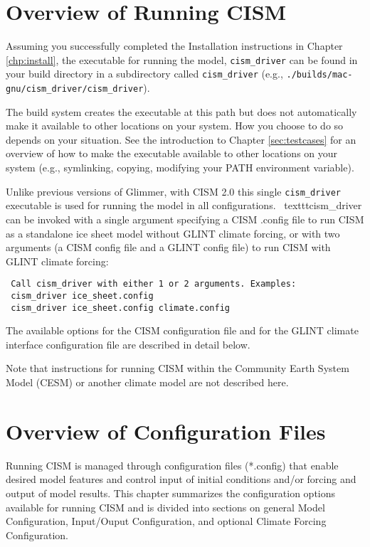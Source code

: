 \label{ch:runcism}

\section{Overview of Running CISM}

Assuming you successfully completed the Installation instructions in Chapter \ref{chp:install},
the executable for running the model, \texttt{cism\_driver} can be found in your 
build directory in a subdirectory called \texttt{cism\_driver} 
(e.g., \texttt{./builds/mac-gnu/cism\_driver/cism\_driver}).

The build system creates the executable at this path but does not automatically
make it available to other locations on your system.  How you choose to do so depends 
on your situation.  See the introduction to Chapter \ref{sec:testcases} for 
an overview of how to make the executable available to other locations on your system
(e.g., symlinking, copying, modifying your PATH environment variable).

Unlike previous versions of Glimmer, with CISM 2.0 this single \texttt{cism\_driver} 
executable is used for running the model in all configurations.  \
texttt{cism\_driver} can be invoked with a single argument specifying 
a CISM .config file to run CISM  as a standalone ice sheet model without GLINT climate forcing,
 or with two arguments (a CISM config file and a GLINT config file) 
to run CISM with GLINT climate forcing:
\begin{verbatim}
 Call cism_driver with either 1 or 2 arguments. Examples:
 cism_driver ice_sheet.config
 cism_driver ice_sheet.config climate.config
\end{verbatim}
The available options for the CISM configuration file and 
for the GLINT climate interface configuration file are described in detail below.

Note that instructions for running CISM within the Community Earth System Model (CESM)
or another climate model are not described here.



\section{Overview of Configuration Files}

Running CISM is managed through configuration files (*.config) that enable 
desired model features and control input of initial conditions and/or forcing 
and output of model results.  This chapter summarizes the configuration options 
available for running CISM and is divided into sections on general Model Configuration, 
Input/Ouput Configuration, and optional Climate Forcing Configuration.

